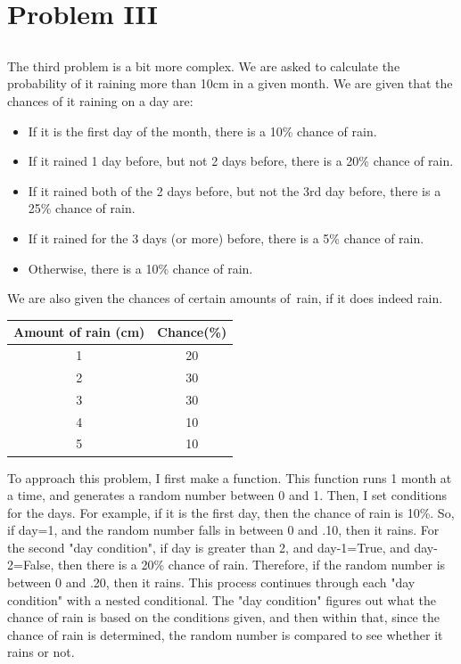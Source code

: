 \documentclass[twocolumn]{revtex4}
\begin{document}
\section{Problem III}
\subsection{}
The third problem is a bit more complex. We are asked to calculate the probability of it raining more than 10cm in a given month. We are given that the chances of it raining on a day are: 
\begin{itemize}
\item If it is the first day of the month, there is a 10\% chance of rain.
\item If it rained 1 day before, but not 2 days before, there is a 20\% chance of rain. 
\item If it rained both of the 2 days before, but not the 3rd day before, there is a 25\% chance of rain.
\item If it rained for the 3 days (or more) before, there is a 5\% chance of rain.  
\item Otherwise, there is a 10\% chance of rain.
\end{itemize}
We are also given the chances of certain amounts of~rain, if it does indeed rain.
\begin{center}
\begin{tabular}{c | c} 
Amount of rain (cm) & Chance(\%) \\
\hline
1 & 20 \\
2 & 30 \\
3 & 30 \\
4 & 10 \\
5 & 10 \\
\end{tabular}
\end{center}
To approach this problem, I first make a function. This function runs 1 month at a time, and generates a random number between 0 and 1. Then, I set conditions for the days. For example, if it is the first day, then the chance of rain is 10\%. So, if day=1, and the random number falls in between 0 and .10, then it rains. For the second "day condition", if day is greater than 2, and day-1=True, and day-2=False, then there is a 20\% chance of rain. Therefore, if the random number is between 0 and .20, then it rains. This process continues through each "day condition" with a nested conditional. The "day condition" figures out what the chance of rain is based on the conditions given, and then within that, since the chance of rain is determined, the random number is compared to see whether it rains or not.\\
\end{document}
